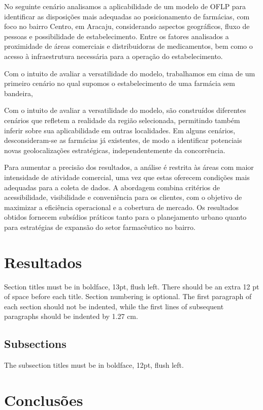 \documentclass[12pt]{article}
\begin{document}
No seguinte cenário analisamos a aplicabilidade de um modelo de OFLP para identificar as disposições mais adequadas ao posicionamento de farmácias, com foco no bairro Centro, em Aracaju, considerando aspectos geográficos, fluxo de pessoas e possibilidade de estabelecimento. Entre os fatores analisados a proximidade de áreas comerciais e distribuidoras de medicamentos, bem como o acesso à infraestrutura necessária para a operação do estabelecimento.

Com o intuito de avaliar a versatilidade do modelo, trabalhamos em cima de um primeiro cenário no qual supomos o estabelecimento de uma farmácia sem bandeira, 

Com o intuito de avaliar a versatilidade do modelo, são construídos diferentes cenários que refletem a realidade da região selecionada, permitindo também inferir sobre sua aplicabilidade em outras localidades. Em alguns cenários, desconsideram-se as farmácias já existentes, de modo a identificar potenciais novas geolocalizações estratégicas, independentemente da concorrência.

Para aumentar a precisão dos resultados, a análise é restrita às áreas com maior intensidade de atividade comercial, uma vez que estas oferecem condições mais adequadas para a coleta de dados. A abordagem combina critérios de acessibilidade, visibilidade e conveniência para os clientes, com o objetivo de maximizar a eficiência operacional e a cobertura de mercado. Os resultados obtidos fornecem subsídios práticos tanto para o planejamento urbano quanto para estratégias de expansão do setor farmacêutico no bairro.

\section{Resultados}

Section titles must be in boldface, 13pt, flush left. There should be an extra
12 pt of space before each title. Section numbering is optional. The first
paragraph of each section should not be indented, while the first lines of
subsequent paragraphs should be indented by 1.27 cm.

\subsection{Subsections}

The subsection titles must be in boldface, 12pt, flush left.

\section{Conclusões}\label{sec:figs}
\end{document}
